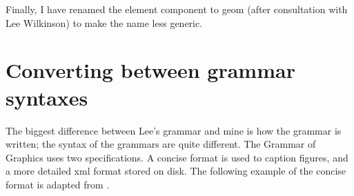 Finally, I have renamed the element component to geom (after consultation with Lee Wilkinson) to make the name less generic.  

% 
% 
% 
% 
% 
% 
% 
% 
% 

\section{Converting between grammar syntaxes}

The biggest difference between Lee's grammar and mine is how the grammar is written; the syntax of the grammars are quite different.  The Grammar of Graphics uses two specifications.  A concise format is used to caption figures, and a more detailed xml format stored on disk.  The following example of the concise format is adapted from \citet[][Figure 1.5, page 13]{wilkinson:2006}.

